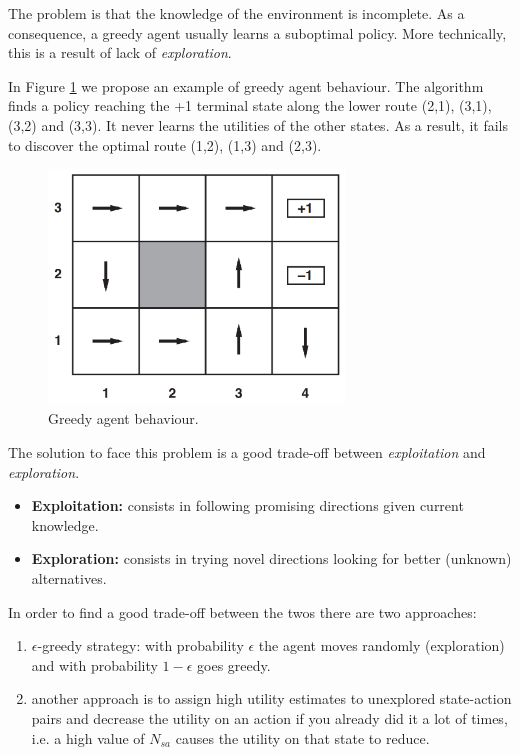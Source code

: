 The problem is that the knowledge of the environment is incomplete. As a consequence,
a greedy agent usually learns a suboptimal policy. More technically, this is a
result of lack of \textit{exploration}.
\newline

In Figure \ref{fig:greedyAgent} we propose an example of greedy agent behaviour.
The algorithm finds a policy reaching the +1 terminal state along the lower route
(2,1), (3,1), (3,2) and (3,3). It never learns the utilities of the other states.
As a result, it fails to discover the optimal route (1,2), (1,3) and (2,3).

\begin{figure}[H]
	\centering
	\includegraphics[width=0.7\textwidth]{
		images/19_ReinforcementLearning_greedyAgent.png
	}
	\caption{Greedy agent behaviour.}
	\label{fig:greedyAgent}
\end{figure}

The solution to face this problem is a good trade-off between \textit{exploitation}
and \textit{exploration}.
\begin{itemize}
	\item \textbf{Exploitation:} consists in following promising directions given
		current knowledge.

	\item \textbf{Exploration:} consists in trying novel directions looking for
		better (unknown) alternatives.
\end{itemize}

In order to find a good trade-off between the twos there are two approaches:
\begin{enumerate}
	\item $\epsilon$-greedy strategy: with probability $\epsilon$ the agent moves
		randomly (exploration) and with probability $1 - \epsilon$ goes greedy.

	\item another approach is to assign high utility estimates to unexplored state-action
		pairs and decrease the utility on an action if you already did it a lot of times,
		i.e. a high value of $N_{sa}$ causes the utility on that state to reduce.
\end{enumerate}


